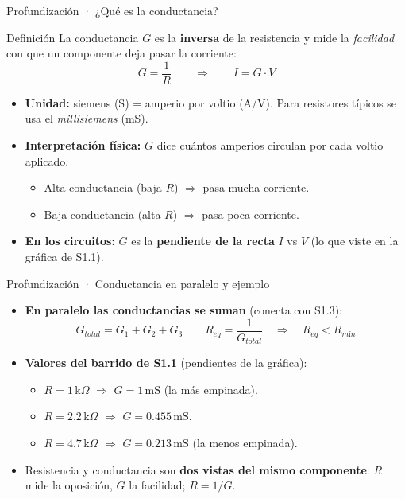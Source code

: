 \documentclass[aspectratio=169]{beamer}
\begin{document}
\begin{frame}{Profundización · ¿Qué es la conductancia?}
  \begin{block}{Definición}
    La conductancia $G$ es la \textbf{inversa} de la resistencia y mide la
    \emph{facilidad} con que un componente deja pasar la corriente:
    \[
      G = \frac{1}{R}
      \qquad\Longrightarrow\qquad
      I = G\cdot V
    \]
  \end{block}
  \begin{itemize}
    \item \textbf{Unidad:} siemens (S) = amperio por voltio (A/V). Para resistores
      típicos se usa el \emph{millisiemens} (mS).
    \item \textbf{Interpretación física:} $G$ dice cuántos amperios circulan por cada
      voltio aplicado.
      \begin{itemize}
        \item Alta conductancia (baja $R$) $\Rightarrow$ pasa mucha corriente.
        \item Baja conductancia (alta $R$) $\Rightarrow$ pasa poca corriente.
      \end{itemize}
    \item \textbf{En los circuitos:} $G$ es la \textbf{pendiente de la recta} $I$ vs $V$
      (lo que viste en la gráfica de S1.1).
  \end{itemize}
\end{frame}

\begin{frame}{Profundización · Conductancia en paralelo y ejemplo}
  \begin{itemize}
    \item \textbf{En paralelo las conductancias se suman} (conecta con S1.3):
      \[
        G_{total} = G_1 + G_2 + G_3
        \qquad
        R_{eq} = \frac{1}{G_{total}}
        \quad \Rightarrow \quad R_{eq} < R_{mín}
      \]
    \item \textbf{Valores del barrido de S1.1} (pendientes de la gráfica):
      \begin{itemize}
        \item $R = 1\,\text{k}\Omega$ $\Rightarrow$ $G = 1\,\text{mS}$ (la más empinada).
        \item $R = 2.2\,\text{k}\Omega$ $\Rightarrow$ $G = 0.455\,\text{mS}$.
        \item $R = 4.7\,\text{k}\Omega$ $\Rightarrow$ $G = 0.213\,\text{mS}$ (la menos empinada).
      \end{itemize}
    \item Resistencia y conductancia son \textbf{dos vistas del mismo componente}:
      $R$ mide la oposición, $G$ la facilidad; $R = 1/G$.
  \end{itemize}
\end{frame}
\end{document}
